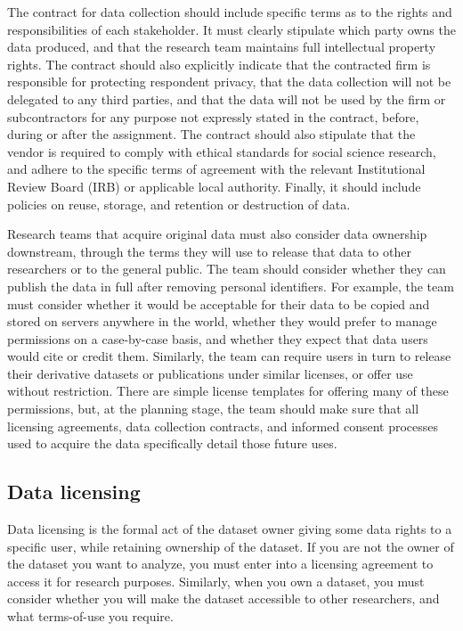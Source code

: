 The contract for data collection should include specific terms
as to the rights and responsibilities of each stakeholder.
It must clearly stipulate which party owns the data produced,
and that the research team maintains full intellectual property rights.
The contract should also explicitly indicate that the contracted firm
is responsible for protecting respondent privacy,
that the data collection will not be delegated to any third parties,
and that the data will not be used by the firm or subcontractors for any purpose not expressly stated in the contract,
before, during or after the assignment.
The contract should also stipulate that the vendor is required to comply with
ethical standards for social science research,
and adhere to the specific terms of agreement with the relevant
Institutional Review Board (IRB)
or applicable local authority.
Finally, it should include policies on reuse, storage, and retention or destruction of data.

Research teams that acquire original data must also consider data ownership downstream,
through the terms they will use to release that data to other researchers or to the general public.
The team should consider whether they can publish the data in full after removing personal identifiers.
For example, the team must consider whether it would be acceptable for
their data to be copied and stored on servers anywhere in the world,
whether they would prefer to manage permissions on a case-by-case basis,
and whether they expect that data users would cite or credit them.
Similarly, the team can require users in turn to release
their derivative datasets or publications under similar licenses,
or offer use without restriction.
There are simple license templates for offering many of these permissions,
but, at the planning stage, the team should make sure
that all licensing agreements, data collection contracts,
and informed consent processes
used to acquire the data specifically detail those future uses.


\subsection{Data licensing}

Data licensing
is the formal act of the dataset owner
giving some data rights to a specific user,
while retaining ownership of the dataset.
If you are not the owner of the dataset you want to analyze,
you must enter into a licensing agreement to access it for research purposes.
Similarly, when you own a dataset,
you must consider whether you will make the dataset accessible to other researchers,
and what terms-of-use you require.

